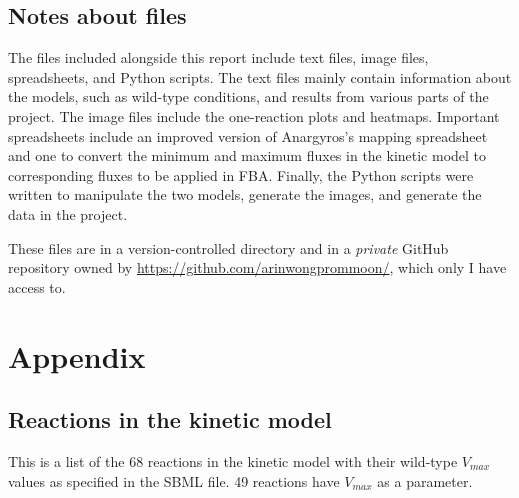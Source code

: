 \documentclass[parskip=full]{scrreprt}
\begin{document}
\section{Notes about files}
\label{sec:files}

The files included alongside this report include text files, image files, spreadsheets, and Python scripts. The text files mainly contain information about the models, such as wild-type conditions, and results from various parts of the project. The image files include the one-reaction plots and heatmaps. Important spreadsheets include an improved version of Anargyros's mapping spreadsheet and one to convert the minimum and maximum fluxes in the kinetic model to corresponding fluxes to be applied in FBA. Finally, the Python scripts were written to manipulate the two models, generate the images, and generate the data in the project.

These files are in a version-controlled directory and in a \emph{private} GitHub repository owned by \url{https://github.com/arinwongprommoon/}, which only I have access to.

\appendix
\chapter*{Appendix}
\renewcommand{\thesection}{\Alph{section}}

\section{Reactions in the kinetic model}
\label{ap:kineticreactionlist}

This is a list of the 68 reactions in the kinetic model with their wild-type $V_{max}$ values as specified in the SBML file. 49 reactions have $V_{max}$ as a parameter.
\end{document}
